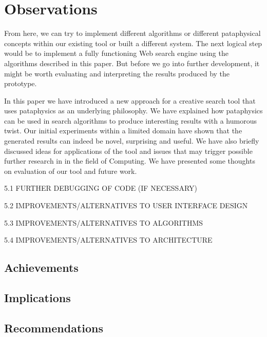 
\chapter{Observations}
\label{ch:observations}

From here, we can try to implement different algorithms or different pataphysical concepts within our existing tool or built a different system. The next logical step would be to implement a fully functioning Web search engine using the algorithms described in this paper. But before we go into further development, it might be worth evaluating and interpreting the results produced by the prototype.

In this paper we have introduced a new approach for a creative search tool that uses pataphysics as an underlying philosophy.  We have explained how pataphysics can be used in search algorithms to produce interesting results with a humorous twist. Our initial experiments within a limited domain have shown that the generated results can indeed be novel, surprising and useful. We have also briefly discussed ideas for applications of the tool and issues that may trigger possible further research in in the field of Computing. We have presented some thoughts on evaluation of our tool and future work.

5.1	FURTHER DEBUGGING OF CODE (IF NECESSARY)

5.2	IMPROVEMENTS/ALTERNATIVES TO USER INTERFACE DESIGN

5.3	IMPROVEMENTS/ALTERNATIVES TO ALGORITHMS

5.4	IMPROVEMENTS/ALTERNATIVES TO ARCHITECTURE

\section{Achievements}

\section{Implications}

\section{Recommendations}
